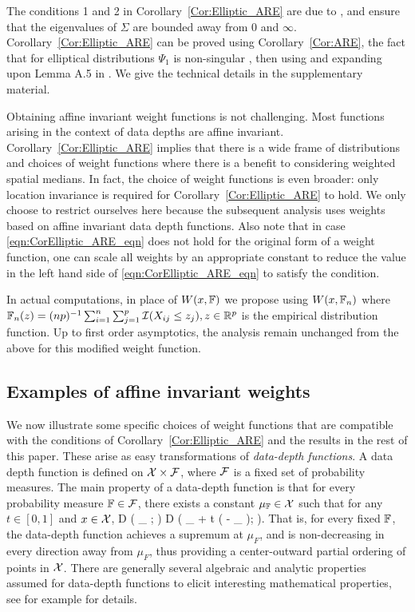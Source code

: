 The conditions 1 and 2 in Corollary~\ref{Cor:Elliptic_ARE} are due to \cite{ref:JASA151658_WangPengLi}, and ensure that the eigenvalues of $\Sigma$ are bounded away from 0 and $\infty$. Corollary~\ref{Cor:Elliptic_ARE} can be proved using Corollary~\ref{Cor:ARE}, the fact that for elliptical distributions $\Psi_1$ is non-singular \cite{ref:SPL12765_Taskinenetal}, then using and expanding upon Lemma A.5 in \cite{ref:JASA151658_WangPengLi}. We give the technical details in the supplementary material.

Obtaining affine invariant weight functions is not challenging. Most functions arising in the context of data depths are affine invariant. Corollary~\ref{Cor:Elliptic_ARE} implies that there is a wide frame of distributions and  choices of weight functions where there is a benefit to considering weighted spatial medians. In fact, the choice of weight functions is even broader: only location invariance is required for Corollary~\ref{Cor:Elliptic_ARE} to hold. We only choose to restrict ourselves here because the subsequent analysis uses weights based on affine invariant data depth functions. Also note that in case \eqref{eqn:CorElliptic_ARE_eqn} does not hold for the original form of a weight function, one can scale all weights by an appropriate constant to reduce the value in the left hand side of \eqref{eqn:CorElliptic_ARE_eqn} to satisfy the condition.

In actual computations, in place of $W (x, {\mathbb{F}})$ we propose using $W (x, {\mathbb{F}}_{n})$ where
$ {\mathbb{F}}_{n}(z) = (np)^{-1} \sum_{i = 1}^{n} \sum_{j=1}^p
\mathcal{I} (X_{ij} \leq z_j ), z \in {\mathbb{R}}^p
$ is the empirical distribution function. Up to first order asymptotics, the analysis remain unchanged from the above for this modified weight function.

\subsection{Examples of affine invariant weights}

We now illustrate some specific choices of weight functions that are compatible with the 
conditions of Corollary~\ref{Cor:Elliptic_ARE} and the results in the rest of this paper.
 These arise as easy transformations 
of \textit{data-depth functions}. A data depth function 
is defined on $\mathcal{X} \times \mathcal{F}$, where $\mathcal{F}$ is  a fixed set of probability measures.
The main property of a data-depth function is that for every probability measure 
${\mathbb{F}} \in \mathcal{F}$, there exists a constant 
$\mu_{{\mathbb{F}}} \in  \mathcal{X}$ such that for any $t \in [ 0, 1]$ and $x \in \mathcal{X}$,
\baq 
D ( \mu_{\BF} ; \BF ) \geq D ( \mu_{\BF} + t ( \bfx - \mu_{\BF} ); \BF ). 
\label{eq:Peripherality}
\eaq
That is, for every fixed ${\mathbb{F}}$, the data-depth function achieves a supremum at 
$\mu_{F}$, and is non-decreasing in every direction away from $\mu_{F}$, thus providing 
a  center-outward partial ordering of points in $\mathcal{X}$. There are generally several 
algebraic and analytic properties assumed for data-depth functions to elicit interesting 
mathematical properties, see for example \cite{ref:DIMACS061_Serfling, ref:AoS00461_ZuoSerfling} for details.

